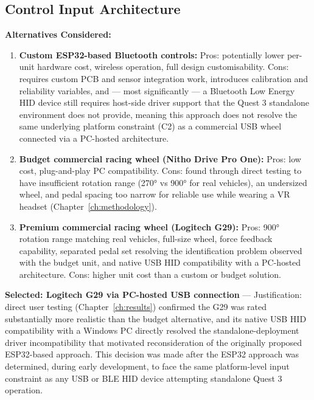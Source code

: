 \label{sec:control_input_architecture}
\subsection{Control Input Architecture}
\textbf{Alternatives Considered:}
\begin{enumerate}
    \item \textbf{Custom ESP32-based Bluetooth controls:} Pros: potentially lower per-unit hardware cost, wireless operation, full design customisability. Cons: requires custom PCB and sensor integration work, introduces calibration and reliability variables, and — most significantly — a Bluetooth Low Energy HID device still requires host-side driver support that the Quest 3 standalone environment does not provide, meaning this approach does not resolve the same underlying platform constraint (C2) as a commercial USB wheel connected via a PC-hosted architecture.
    \item \textbf{Budget commercial racing wheel (Nitho Drive Pro One):} Pros: low cost, plug-and-play PC compatibility. Cons: found through direct testing to have insufficient rotation range (270° vs 900° for real vehicles), an undersized wheel, and pedal spacing too narrow for reliable use while wearing a VR headset (Chapter~\ref{ch:methodology}).
    \item \textbf{Premium commercial racing wheel (Logitech G29):} Pros: 900° rotation range matching real vehicles, full-size wheel, force feedback capability, separated pedal set resolving the identification problem observed with the budget unit, and native USB HID compatibility with a PC-hosted architecture. Cons: higher unit cost than a custom or budget solution.
\end{enumerate}
\textbf{Selected: Logitech G29 via PC-hosted USB connection} — Justification: direct user testing (Chapter~\ref{ch:results}) confirmed the G29 was rated substantially more realistic than the budget alternative, and its native USB HID compatibility with a Windows PC directly resolved the standalone-deployment driver incompatibility that motivated reconsideration of the originally proposed ESP32-based approach. This decision was made after the ESP32 approach was determined, during early development, to face the same platform-level input constraint as any USB or BLE HID device attempting standalone Quest 3 operation.

